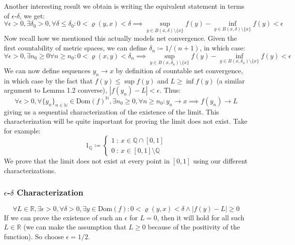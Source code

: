 \documentclass[10pt,letterpaper]{article} %
\begin{document}
\medskip
Another interesting result we obtain is writing the equivalent statement in terms of $\epsilon$-$\delta$, we get:
\begin{equation*}
\forall \epsilon > 0, \exists \delta_0 > 0, \forall \delta \leqslant \delta_0: 0 < \varrho(y, x) < \delta \implies \sup_{y \in B(x, \delta)\setminus \{x\}}f(y) - \inf_{y \in B(x, \delta)\setminus \{x\}}f(y) < \epsilon 
\end{equation*}
Now recall how we mentioned this actually models net convergence. Given the first countability of metric spaces, we can define $\delta_n \coloneq 1/(n+1)$, in which case:
\begin{equation*}
\forall \epsilon > 0, \exists n_0 \geqslant 0 \forall n \geqslant n_0: 0 < \varrho(x, y) < \delta_n \implies \sup_{y \in B(x, \delta_n)\setminus \{x\}}f(y) - \inf_{y \in B(x, \delta_n)\setminus \{x\}}f(y) < \epsilon 
\end{equation*}
We can now define sequences $y_n \xrightarrow{} x$ by definition of countable net convergence, in which case by the fact that $f(y) \leqslant \sup f(y)$ and $L \geqslant \inf f(y)$ (a similar argument to Lemma 1.2 converse), $|f(y_n) - L| < \epsilon$. Thus:
\begin{equation*}
\forall \epsilon > 0, \forall \{y_n\}_{n \in \mathbb{N}} \in \text{Dom}(f)^\mathbb{N}, \exists n_0 \geqslant 0, \forall n \geqslant n_0: y_n \xrightarrow{} x \implies f(y_n) \xrightarrow{} L
\end{equation*}
giving us a sequential characterization of the existence of the limit. This characterization will be quite important for proving the limit does not exist. Take for example:
\begin{equation*}
  1_{\mathbb{Q}} \coloneq \begin{cases*}
    1 \ : \ x \in \mathbb{Q} \cap [0, 1]\\
    0 \ : \ x \in [0, 1] \setminus \mathbb{Q}
  \end{cases*}
\end{equation*}
We prove that the limit does not exist at every point in $[0, 1]$ using our different characterizations.
\subsubsection*{$\epsilon$-$\delta$ Characterization}
\begin{equation*}
  \forall L \in \mathbb{R}, \exists \epsilon > 0, \forall \delta > 0, \exists y \in \text{Dom}(f): 0 < \varrho(y, x) < \delta \land |f(y) - L| \geqslant 0
\end{equation*}
If we can prove the existence of such an $\epsilon$ for $L = 0$, then it will hold for all such $L \in \mathbb{R}$ (we can make the assumption that $L \geqslant 0$ because of the positivity of the function). So choose $\epsilon = 1/2$.\\
\end{document}
